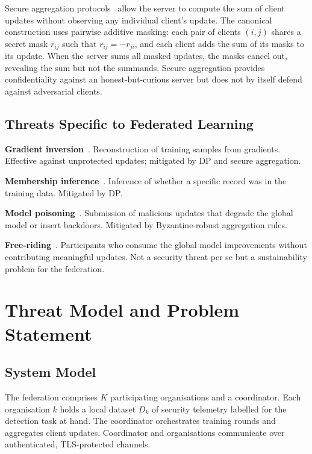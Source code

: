 \documentclass[sigconf,nonacm]{acmart}
\begin{document}
Secure aggregation protocols~\cite{bonawitz2017secagg} allow the server to
compute the sum of client updates without observing any individual
client's update. The canonical construction uses pairwise additive masking:
each pair of clients $(i, j)$ shares a secret mask $r_{ij}$ such that
$r_{ij} = -r_{ji}$, and each client adds the sum of its masks to its
update. When the server sums all masked updates, the masks cancel out,
revealing the sum but not the summands. Secure aggregation provides
confidentiality against an honest-but-curious server but does not by
itself defend against adversarial clients.

\subsection{Threats Specific to Federated Learning}

\textbf{Gradient inversion}~\cite{zhu2019dlg,geiping2020inverting}.
Reconstruction of training samples from gradients. Effective against
unprotected updates; mitigated by DP and secure aggregation.

\textbf{Membership inference}~\cite{shokri2017membership}. Inference
of whether a specific record was in the training data. Mitigated by DP.

\textbf{Model poisoning}~\cite{bagdasaryan2020backdoor}. Submission of
malicious updates that degrade the global model or insert backdoors.
Mitigated by Byzantine-robust aggregation rules.

\textbf{Free-riding}~\cite{lin2019free}. Participants who consume the
global model improvements without contributing meaningful updates. Not a
security threat per se but a sustainability problem for the federation.

\section{Threat Model and Problem Statement}

\subsection{System Model}

The federation comprises $K$ participating organisations and a coordinator.
Each organisation $k$ holds a local dataset $D_k$ of security telemetry
labelled for the detection task at hand. The coordinator orchestrates
training rounds and aggregates client updates. Coordinator and organisations
communicate over authenticated, TLS-protected channels.
\end{document}
